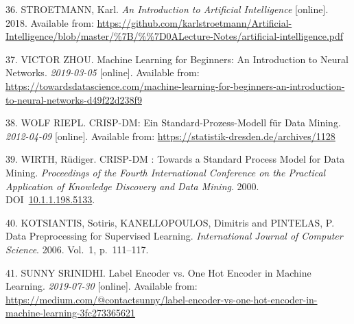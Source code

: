 \documentclass[12pt,english,a4paper,oneside,,tablecaptionabove]{scrbook}
\begin{document}
\leavevmode\hypertarget{ref-Stroetmann2018}{}%
36. STROETMANN, Karl. \emph{An Introduction to Artificial Intelligence}
{[}online{]}. 2018. Available from:
\url{https://github.com/karlstroetmann/Artificial-Intelligence/blob/master/\%7B/\%\%7D0ALecture-Notes/artificial-intelligence.pdf}

\leavevmode\hypertarget{ref-VictorZhou}{}%
37. VICTOR ZHOU. Machine Learning for Beginners: An Introduction to
Neural Networks. \emph{2019-03-05} {[}online{]}. Available from:
\url{https://towardsdatascience.com/machine-learning-for-beginners-an-introduction-to-neural-networks-d49f22d238f9}

\leavevmode\hypertarget{ref-WolfRiepl}{}%
38. WOLF RIEPL. CRISP-DM: Ein Standard-Prozess-Modell für Data Mining.
\emph{2012-04-09} {[}online{]}. Available from:
\url{https://statistik-dresden.de/archives/1128}

\leavevmode\hypertarget{ref-Wirth2000}{}%
39. WIRTH, Rüdiger. CRISP-DM : Towards a Standard Process Model for Data
Mining. \emph{Proceedings of the Fourth International Conference on the
Practical Application of Knowledge Discovery and Data Mining}. 2000.
DOI~\href{https://doi.org/10.1.1.198.5133}{10.1.1.198.5133}.

\leavevmode\hypertarget{ref-article}{}%
40. KOTSIANTIS, Sotiris, KANELLOPOULOS, Dimitris and PINTELAS, P. Data
Preprocessing for Supervised Learning. \emph{International Journal of
Computer Science}. 2006. Vol.~1, p.~111--117.

\leavevmode\hypertarget{ref-SunnySrinidhi}{}%
41. SUNNY SRINIDHI. Label Encoder vs. One Hot Encoder in Machine
Learning. \emph{2019-07-30} {[}online{]}. Available from:
\url{https://medium.com/@contactsunny/label-encoder-vs-one-hot-encoder-in-machine-learning-3fc273365621}
\end{document}
